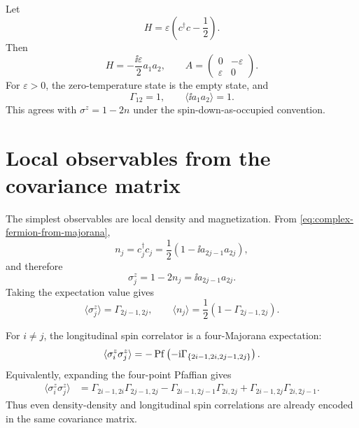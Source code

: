 \begin{example}
Let
\begin{equation}
    H=\varepsilon\left(c^\dagger c-\frac12\right).
\end{equation}
Then
\begin{equation}
    H=-\frac{\ii\varepsilon}{2}a_1a_2,
    \qquad
    A=
    \begin{pmatrix}
        0&-\varepsilon\\
        \varepsilon&0
    \end{pmatrix}.
\end{equation}
For $\varepsilon>0$, the zero-temperature state is the empty state, and
\begin{equation}
    \Gamma_{12}=1,
    \qquad
    \langle \ii a_1a_2\rangle=1.
\end{equation}
This agrees with $\sigma^z=1-2n$ under the spin-down-as-occupied convention.
\end{example}

\section{Local observables from the covariance matrix}
\label{sec:local-observables-from-covariance}

The simplest observables are local density and magnetization.  From
\cref{eq:complex-fermion-from-majorana},
\begin{equation}
\label{eq:number-from-majoranas}
    n_j=c_j^\dagger c_j
    =\frac12\left(1-\ii a_{2j-1}a_{2j}\right),
\end{equation}
and therefore
\begin{equation}
\label{eq:sigmaz-from-majoranas}
    \sigma_j^z=1-2n_j=\ii a_{2j-1}a_{2j}.
\end{equation}
Taking the expectation value gives
\begin{equation}
\label{eq:sigmaz-expectation-from-gamma}
    \langle \sigma_j^z\rangle
    =
    \Gamma_{2j-1,2j},
    \qquad
    \langle n_j\rangle
    =
    \frac12\left(1-\Gamma_{2j-1,2j}\right).
\end{equation}

For $i\neq j$, the longitudinal spin correlator is a four-Majorana expectation:
\begin{equation}
\label{eq:sigmaz-sigmaz-pfaffian}
    \langle \sigma_i^z\sigma_j^z\rangle
    =
    -\operatorname{Pf}\left(-\mathrm{i}\Gamma_{\{2i-1,2i,2j-1,2j\}}\right).
\end{equation}
Equivalently, expanding the four-point Pfaffian gives
\begin{align}
\label{eq:sigmaz-sigmaz-expanded}
    \langle \sigma_i^z\sigma_j^z\rangle
    &
    =
    \Gamma_{2i-1,2i}\Gamma_{2j-1,2j}
    -
    \Gamma_{2i-1,2j-1}\Gamma_{2i,2j}
    +
    \Gamma_{2i-1,2j}\Gamma_{2i,2j-1}.
\end{align}
Thus even density-density and longitudinal spin correlations are already
encoded in the same covariance matrix.

